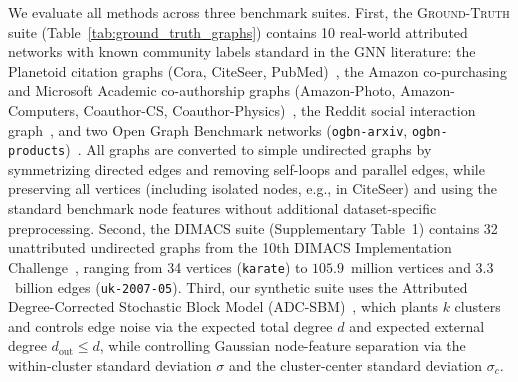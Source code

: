 \documentclass[11pt,a4paper]{article}
\begin{document}
We evaluate all methods across three benchmark suites. First, the \textsc{Ground-Truth} suite (Table~\ref{tab:ground_truth_graphs}) contains 10 real-world attributed networks with known community labels standard in the GNN literature: the Planetoid citation graphs (Cora, CiteSeer, PubMed)~\cite{sen2008collective,yang2016revisiting}, the Amazon co-purchasing and Microsoft Academic co-authorship graphs (Amazon-Photo, Amazon-Computers, Coauthor-CS, Coauthor-Physics)~\cite{shchur2018pitfalls}, the Reddit social interaction graph~\cite{hamilton2017inductive}, and two Open Graph Benchmark networks (\texttt{ogbn-arxiv}, \texttt{ogbn-products})~\cite{hu2020open}. All graphs are converted to simple undirected graphs by symmetrizing directed edges and removing self-loops and parallel edges, while preserving all vertices (including isolated nodes, e.g., in CiteSeer) and using the standard benchmark node features without additional dataset-specific preprocessing. Second, the \textsc{DIMACS} suite (Supplementary Table~1) contains 32 unattributed undirected graphs from the 10th DIMACS Implementation Challenge~\cite{dimacschallengegraphpartandcluster}, ranging from 34 vertices (\texttt{karate}) to $105.9$~million vertices and $3.3$~billion edges (\texttt{uk-2007-05}). Third, our synthetic suite uses the Attributed Degree-Corrected Stochastic Block Model (ADC-SBM)~\cite{adcsbm2022}, which plants $k$ clusters and controls edge noise via the expected total degree $d$ and expected external degree $d_{\text{out}} \le d$, while controlling Gaussian node-feature separation via the within-cluster standard deviation $\sigma$ and the cluster-center standard deviation $\sigma_c$.
\end{document}
